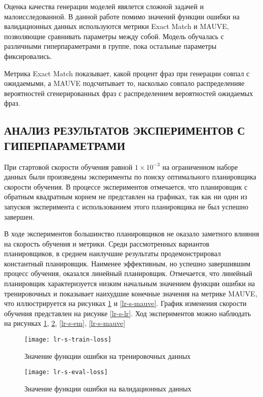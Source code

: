 Оценка качества генерации моделей явялется сложной задачей и малоисследованной. В данной работе помимо значений функции ошибки на валидационных данных используются метрики Exact Match и MAUVE, позволяющие сравнивать параметры между собой. Модель обучалась с различными гиперпараметрами в группе, пока остальные параметры фиксировались.

Метрика Exact Match показывает, какой процент фраз при генерации совпал с ожидаемыми, а MAUVE подсчитывает то, насколько совпало распределенияе вероятностей сгенерированных фраз с распределением вероятностей ожидаемых фраз.

\subsection{АНАЛИЗ РЕЗУЛЬТАТОВ ЭКСПЕРИМЕНТОВ С ГИПЕРПАРАМЕТРАМИ}

При стартовой скорости обучения равной $1 \times 10^{-3}$ на ограниченном наборе данных были произведены эксперименты по поиску оптимального планировщика скорости обучения. В процессе экспериментов отмечается, что планировщик с обратным квадратным корнем не представлен на графиках, так как ни один из запусков эксперимента с использованием этого планировщика не был успешно завершен.

В ходе экспериментов большинство планировщиков не оказало заметного влияния на скорость обучения и метрики. Среди рассмотренных вариантов планировщиков, в среднем наилучшие результаты продемонстрировал константный планировщик. Наименее эффективным, но успешно завершившим процесс обучения, оказался линейный планировщик. Отмечается, что линейный планировщик характеризуется низким начальным значением функции ошибки на тренировочных и показывает наихудшие конечные значения на метрике MAUVE, что иллюстрируется на рисунках \ref{lr-s-train-loss} и \ref{lr-s-mauve}. График изменения скорости обучения представлен на рисунке \ref{lr-s-lr}. Ход экспериментов можно наблюдать на рисунках \ref{lr-s-train-loss}, \ref{lr-s-eval-loss}, \ref{lr-s-em}, \ref{lr-s-mauve}

\begin{figure}[!ht]
  \centering
  \texttt{[image: lr-s-train-loss]}
  \caption{Значение функции ошибки на тренировочных данных}
  \label{lr-s-train-loss}
\end{figure}

\begin{figure}[!ht]
  \centering
  \texttt{[image: lr-s-eval-loss]}
  \caption{Значение функции ошибки на валидационных данных}
  \label{lr-s-eval-loss}
\end{figure}

